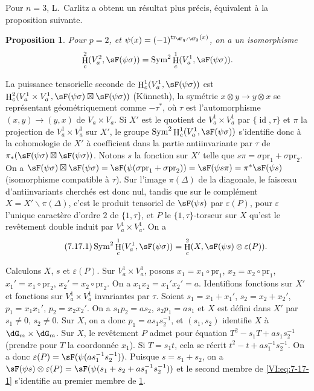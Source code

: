 \documentclass[oneside]{book}
\DeclareMathOperator{\h}{H}
\DeclareMathOperator{\tr}{tr}
\renewcommand{\setminus}{\smallsetminus}
\newcommand{\pr}{\mathrm{pr}} %
\theoremstyle{sga-source}
\theoremstyle{sga-source-dash}
\theoremstyle{sga-source-dotdash}
\theoremstyle{sga-source-number-note-dash}
\theoremstyle{sga-source-note-number-dotdash}
\theoremstyle{sga-source-example-dotdash}
\theoremstyle{sga-source-inline-number}
\theoremstyle{sga-source-bare-number}
\theoremstyle{sga-source}
\newtheorem{proposition_}[subsection]{Proposition}
\newcommand{\PrintPage}[1]{}\newcommand{\MathPage}[1]{}\newcommand{\PrintCite}[2]{#1}\newcommand{\var}[3]{#2}
\begin{document}
Pour $n=3$, L.\ Carlitz \cite{ca69-2} a obtenu un résultat plus précis, 
équivalent à la proposition suivante. 





\begin{proposition_}\label{VI:7-17}
Pour $p=2$, et $\psi(x)=(-1)^{\tr_{\dF_q/\dF_2}(x)}$, on a un isomorphisme 
\[
  \h_c^2(V_a^2,\sF(\psi\sigma)) = \operatorname{Sym}^2 \h_c^1(V_a^1,\sF(\psi\sigma)) \text{.} 
\]
\end{proposition_}

\PrintPage{227}
La puissance tensorielle seconde de $\h_c^1(V_a^1,\sF(\psi\sigma))$ est 
$\h_c^2(V_a^1\times V_a^1,\sF(\psi\sigma)\boxtimes \sF(\psi\sigma))$ 
(K\"unneth), la symétrie $x\otimes y\to y\otimes x$ se représentant 
géométriquement comme $-\tau^\ast$, où $\tau$ est l'automorphisme 
$(x,y)\to (y,x)$ de $V_a\times V_a$. Si $X'$ est le quotient de 
$V_a^1\times V_a^1$ par $\{\operatorname{id}{},\tau\}$ et $\pi$ la 
projection de $V_a^1\times V_a^1$ sur $X'$, le groupe 
$\operatorname{Sym}^2 \h_c^1(V_a^1,\sF(\psi\sigma))$ s'identifie donc à la 
cohomologie de $X'$ à coefficient dans la partie antiinvariante par $\tau$ de 
$\pi_\ast(\sF(\psi\sigma)\boxtimes \sF(\psi\sigma))$. Notons $s$ la fonction 
sur $X'$ telle que $s\pi =\sigma\pr_1+\sigma\pr_2$. On a 
$\sF(\psi\sigma)\boxtimes \sF(\psi\sigma) = \sF(\psi(\sigma\pr_1+\sigma\pr_2)) = \sF(\psi s \pi) = \pi^\ast \sF(\psi s)$ 
(isomorphisme compatible à $\tau$). Sur l'image $\pi(\Delta)$ de la 
diagonale, le faisceau d'antiinvariants cherchés est donc nul, tandis que sur 
le complément $X=X'\setminus \pi(\Delta)$, c'est le produit tensoriel de 
$\sF(\psi s)$ par $\varepsilon(P)$, pour $\varepsilon$ l'unique caractère 
d'ordre $2$ de $\{1,\tau\}$, et $P$ le $\{1,\tau\}$-torseur sur $X$ qu'est le 
revêtement double induit par $V_a^1\times V_a^1$. On a 
\begin{equation*}\tag{7.17.1}\label{VI:eq:7-17-1}
  \operatorname{Sym}^2 \h_c^1(V_a^1,\sF(\psi\sigma)) = \h_c^2(X,\sF(\psi s)\otimes \varepsilon(P)) \text{.}
\end{equation*}

Calculons $X$, $s$ et $\varepsilon(P)$. Sur $V_a^1\times V_a^1$, posons 
$x_1=x_1\circ\pr_1$, $x_2=x_2\circ\pr_1$, $x_1'=x_1\circ \pr_2$, 
$x_2'=x_2\circ \pr_2$. On a $x_1 x_2=x_1'x_2'=a$. Identifions fonctions sur 
$X'$ et \var{fonctions sur $X$ invariante par $\tau$}{fonctions sur $V_a^1\times V_a^1$ invariantes par $\tau$}{S45-SOL-0959}. Soient $s_1=x_1+x_1'$, 
$s_2=x_2+x_2'$, $p_1=x_1 x_1'$, $p_2=x_2 x_2'$. On a $s_1 p_2 = a s_2$, 
$s_2 p_1 = a s_1$ et $X$ est défini dans $X'$ par $s_1\ne 0$, $s_2\ne 0$. Sur 
$X$, on a donc $p_1 = a s_1 s_2^{-1}$, et $(s_1,s_2)$ identifie $X$ à 
$\dG_m\times \dG_m$. Sur $X$, le revêtement $P$ admet pour équation 
$T^2-s_1 T+a s_1 s_2^{-1}$ (prendre pour $T$ la coordonnée $x_1$). Si 
$T=s_1 t$, cela se récrit $t^2-t+a s_1^{-1} s_2^{-1}$. On a donc 
$\varepsilon(P) = \sF(\psi(a s_1^{-1} s_2^{-1}))$. Puisque $s=s_1+s_2$, on a 
$\sF(\psi s)\otimes \varepsilon(P) = \sF(\psi(s_1+s_2+ a s_1^{-1} s_2^{-1}))$ 
et le second membre de \eqref{VI:eq:7-17-1} s'identifie au premier membre de 
\ref{VI:7-17}. 
\end{document}
